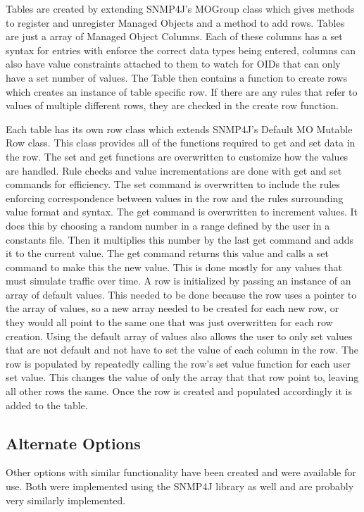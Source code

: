 \documentclass[12pt]{article}
\begin{document}
Tables are created by extending SNMP4J's MOGroup class which gives methods to register and unregister Managed Objects and a method to add rows. Tables are just a array of Managed Object Columns. Each of these columns has a set syntax for entries with enforce the correct data types being entered, columns can also have value constraints attached to them to watch for OIDs that can only have a set number of values. The Table then contains a function to create rows which creates an instance of table specific row. If there are any rules that refer to values of multiple different rows, they are checked in the create row function.

Each table has its own row class which extends SNMP4J's Default MO Mutable Row class. This class provides all of the functions required to get and set data in the row. The set and get functions are overwritten to customize how the values are handled. Rule checks and value incrementations are done with get and set commands for efficiency. The set command is overwritten to include the rules enforcing correspondence between values in the row and the rules surrounding value format and syntax. The get command is overwritten to increment values. It does this by choosing a random number in a range defined by the user in a constants file. Then it multiplies this number by the last get command and adds it to the current value. The get command returns this value and calls a set command to make this the new value. This is done mostly for any values that must simulate traffic over time. A row is initialized by passing an instance of an array of default values. This needed to be done because the row uses a pointer to the array of values, so a new array needed to be created for each new row, or they would all point to the same one that was just overwritten for each row creation. Using the default array of values also allows the user to only set values that are not default and not have to set the value of each column in the row. The row is populated by repeatedly calling the row's set value function for each user set value. This changes the value of only the array that that row point to, leaving all other rows the same. Once the row is created and populated accordingly it is added to the table.
\subsection{Alternate Options}
Other options with similar functionality have been created and were available for use. Both were implemented using the SNMP4J library as well and are probably very similarly implemented. 
\end{document}
